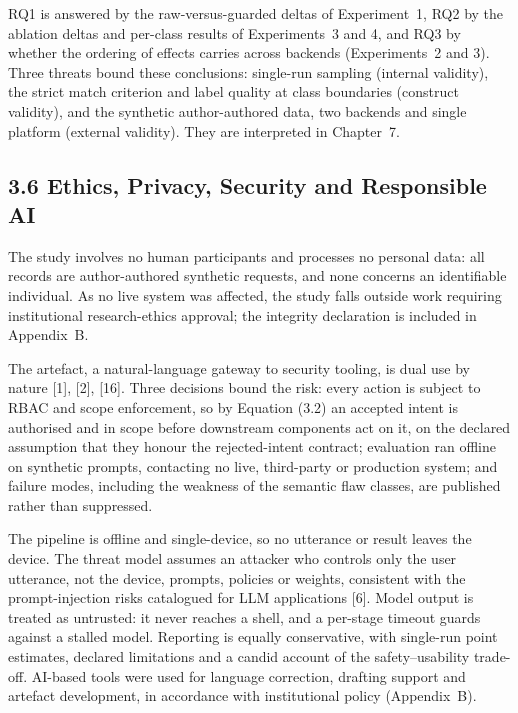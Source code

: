 \documentclass[
]{article}
\begin{document}
RQ1 is answered by the raw-versus-guarded deltas of Experiment~1, RQ2 by
the ablation deltas and per-class results of Experiments~3 and 4, and
RQ3 by whether the ordering of effects carries across backends
(Experiments~2 and 3). Three threats bound these conclusions: single-run
sampling (internal validity), the strict match criterion and label
quality at class boundaries (construct validity), and the synthetic
author-authored data, two backends and single platform (external
validity). They are interpreted in Chapter~7.

\hypertarget{ethics-privacy-security-and-responsible-ai}{%
\subsection{3.6 Ethics, Privacy, Security and Responsible
AI}\label{ethics-privacy-security-and-responsible-ai}}

The study involves no human participants and processes no personal data:
all records are author-authored synthetic requests, and none concerns an
identifiable individual. As no live system was affected, the study falls
outside work requiring institutional research-ethics approval; the
integrity declaration is included in Appendix~B.

The artefact, a natural-language gateway to security tooling, is dual
use by nature {[}1{]}, {[}2{]}, {[}16{]}. Three decisions bound the
risk: every action is subject to RBAC and scope enforcement, so by
Equation (3.2) an accepted intent is authorised and in scope before
downstream components act on it, on the declared assumption that they
honour the rejected-intent contract; evaluation ran offline on synthetic
prompts, contacting no live, third-party or production system; and
failure modes, including the weakness of the semantic flaw classes, are
published rather than suppressed.

The pipeline is offline and single-device, so no utterance or result
leaves the device. The threat model assumes an attacker who controls
only the user utterance, not the device, prompts, policies or weights,
consistent with the prompt-injection risks catalogued for LLM
applications {[}6{]}. Model output is treated as untrusted: it never
reaches a shell, and a per-stage timeout guards against a stalled model.
Reporting is equally conservative, with single-run point estimates,
declared limitations and a candid account of the safety--usability
trade-off. AI-based tools were used for language correction, drafting
support and artefact development, in accordance with institutional
policy (Appendix~B).
\end{document}
